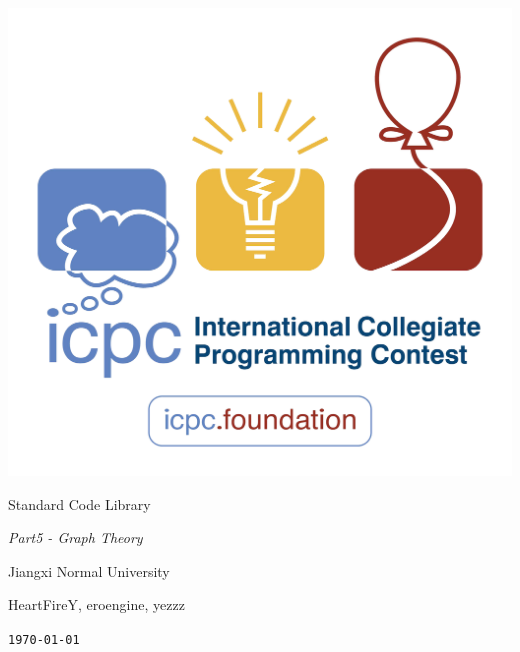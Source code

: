 \documentclass{article}
\begin{document}
\pagestyle{empty}
\begin{center}

    \includegraphics[width=.7\linewidth]{ICPC.png}
    
    \vspace{5em}
    
    \Huge{{Standard Code Library}}
    
    \vspace{2em}
    
    \huge{\textit{Part5 - Graph Theory}}
    
    \vspace{2em}
    
    \Large{\textsf{Jiangxi Normal University}}
    
    \vspace{0.4em}
    
    \Large{\textsf{HeartFireY, eroengine, yezzz}}
    
    \vspace{0.6em}
    
    \texttt{\today}
    
\end{center}
\end{document}
